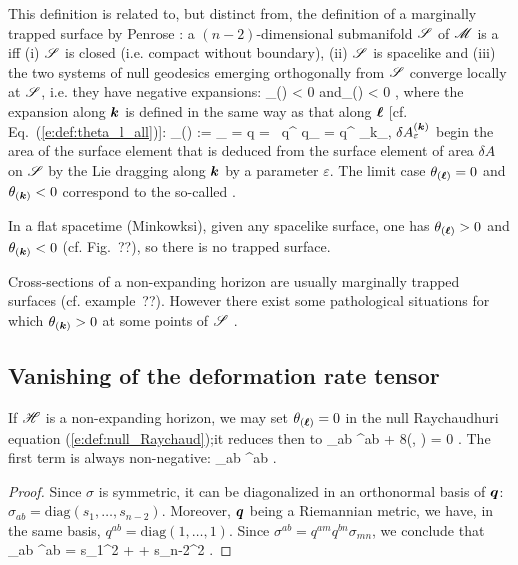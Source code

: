 {{This definition is related to, but distinct from, the definition of a
marginally trapped surface by Penrose \cite{Penro65}: a $(n-2)$-dimensional
submanifold $\mathscr{S}$ of $\mathscr{M}$ is a 
 iff (i) $\mathscr{S}$ is
closed (i.e. compact without boundary), (ii) $\mathscr{S}$ is spacelike and (iii)
the two systems of null geodesics emerging orthogonally from $\mathscr{S}$ converge
locally at $\mathscr{S}$, i.e. they have negative expansions:
\be
    \theta_{(\wl)} < 0 \quad\mbox{and}\quad \theta_{()} < 0 ,
\ee
where the expansion along $\bm{k}$ is defined in the same way as that along
$\bm{\ell}$ [cf. Eq.~(\ref{e:def:theta_l_all})]:
\be
    \theta_{()} := \lim_{\varepsilon{}} 
        =   \ln q
        =  \, q^{\mu\nu}  q_{\mu\nu}
        = q^{\mu\nu} \nabla_\mu k_\nu ,
\ee
$\delta A^{(\bm{k})}_\varepsilon$ begin the area of the surface element
that is deduced from the surface element of area $\delta A$ on $\mathscr{S}$ by the
Lie dragging along $\bm{k}$ by a parameter $\varepsilon$.
The limit case $\theta_{(\bm{\ell})} = 0$ and $\theta_{(\bm{k})}<0$ correspond
to the so-called .

In a flat spacetime (Minkowksi), given any spacelike surface,
one has $\theta_{(\bm{\ell})} > 0$ and $\theta_{(\bm{k})} < 0$ (cf. Fig.~??), so there
is no trapped surface.

Cross-sections of a non-expanding horizon are usually marginally trapped surfaces
(cf. example~??).
However there exist some pathological situations for
which $\theta_{(\bm{k})} > 0$ at some points of $\mathscr{S}$ \cite{GerocH82}.

\subsection{Vanishing of the deformation rate tensor} \label{s:def:NEH_Theta_zero}

If $\mathscr{H}$ is a non-expanding horizon, we may set $\theta_{(\bm{\ell})}=0$
in the null Raychaudhuri equation (\ref{e:def:null_Raychaud});it reduces then
to
\be \label{e:def:null_Raychaud_theta_zero}
    \sigma_{ab} \sigma^{ab} + 8\pi {}(\wl, \wl) = 0 .
\ee
The first term is always non-negative:
\be \label{e:def:sigma_square}
    \sigma_{ab} \sigma^{ab}  .
\ee
\begin{proof}
Since $\sigma$ is symmetric, it can be diagonalized
in an orthonormal basis of $\bm{q}$: $\sigma_{ab} = \mathrm{diag}(s_1,\ldots, s_{n-2})$.
Moreover, $\bm{q}$ being a Riemannian metric, we have, in the same basis, $q^{ab} = \mathrm{diag}(1,\ldots,1)$. Since $\sigma^{ab} = q^{am} q^{bn} \sigma_{mn}$, we conclude that
\be \label{e:def:sigma_square_si}
  \sigma_{ab} \sigma^{ab} = s_1^2 + \cdots + s_{n-2}^2  .
\ee
\end{proof}

}}
